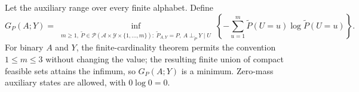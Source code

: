 Let the auxiliary range over every finite alphabet. Define \[G_P(A;Y)=\inf_{\substack{m\geq1,\ \widetilde P\in\mathcal P(\mathcal A\times\mathcal Y\times\{1,\ldots,m\}):\ \widetilde P_{A,Y}=P,\ A\perp_{\widetilde P}Y\mid U}}\left\{-\sum_{u=1}^m\widetilde P(U=u)\log\widetilde P(U=u)\right\}.\] For binary \(A\) and \(Y\), the finite-cardinality theorem permits the convention \(1\leq m\leq3\) without changing the value; the resulting finite union of compact feasible sets attains the infimum, so \(G_P(A;Y)\) is a minimum. Zero-mass auxiliary states are allowed, with \(0\log0=0\).